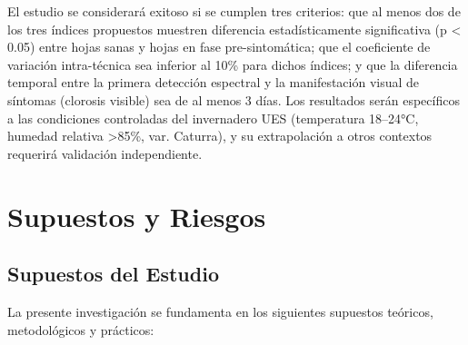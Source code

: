 \documentclass[12pt, a4paper]{article}
\begin{document}
	El estudio se considerará exitoso si se cumplen tres criterios: que al menos dos de los tres índices propuestos muestren diferencia estadísticamente significativa (p < 0.05) entre hojas sanas y hojas en fase pre-sintomática; que el coeficiente de variación intra-técnica sea inferior al 10\% para dichos índices; y que la diferencia temporal entre la primera detección espectral y la manifestación visual de síntomas (clorosis visible) sea de al menos 3 días. Los resultados serán específicos a las condiciones controladas del invernadero UES (temperatura 18--24°C, humedad relativa >85\%, var. Caturra), y su extrapolación a otros contextos requerirá validación independiente.
	
	
	\section{Supuestos y Riesgos}
	
	\subsection{Supuestos del Estudio}
	
	La presente investigación se fundamenta en los siguientes supuestos teóricos, metodológicos y prácticos:
	
\end{document}
